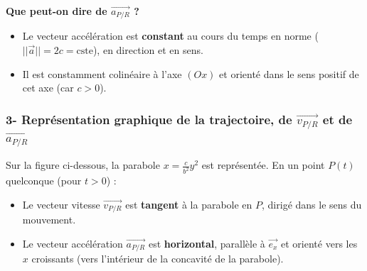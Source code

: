 \documentclass[11pt,a4paper]{article}
\begin{document}
\textbf{Que peut-on dire de $\vec{a_{P/R}}$ ?}
\begin{itemize}
    \item Le vecteur accélération est \textbf{constant} au cours du temps en norme ($||\vec{a}|| = 2c = \text{cste}$), en direction et en sens.
    \item Il est constamment colinéaire à l'axe $(Ox)$ et orienté dans le sens positif de cet axe (car $c > 0$).
\end{itemize}

\subsubsection*{3- Représentation graphique de la trajectoire, de $\vec{v_{P/R}}$ et de $\vec{a_{P/R}}$}
Sur la figure ci-dessous, la parabole $x = \frac{c}{b^2}y^2$ est représentée. En un point $P(t)$ quelconque (pour $t > 0$) :
\begin{itemize}
    \item Le vecteur vitesse $\vec{v_{P/R}}$ est \textbf{tangent} à la parabole en $P$, dirigé dans le sens du mouvement.
    \item Le vecteur accélération $\vec{a_{P/R}}$ est \textbf{horizontal}, parallèle à $\vec{e_x}$ et orienté vers les $x$ croissants (vers l'intérieur de la concavité de la parabole).
\end{itemize}

\begin{center}
\end{center}
\end{document}

